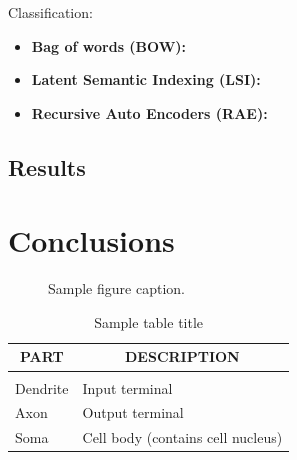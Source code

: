 \documentclass{article} %
\begin{document}
Classification:
\begin{itemize}
\item {\bf Bag of words (BOW):}
\item{\bf Latent Semantic Indexing (LSI):}
\item{\bf Recursive Auto Encoders (RAE):}
\end{itemize}

\subsection{Results}
\label{sec:results}



\section{Conclusions}
\label{sec:conclusions}


\begin{figure}[h]
\begin{center}
\fbox{\rule[-.5cm]{0cm}{4cm} \rule[-.5cm]{4cm}{0cm}}
\end{center}
\caption{Sample figure caption.}
\end{figure}



\begin{table}[t]
\caption{Sample table title}
\label{sample-table}
\begin{center}
\begin{tabular}{ll}
\multicolumn{1}{c}{\bf PART}  &\multicolumn{1}{c}{\bf DESCRIPTION}
\\ \hline \\
Dendrite         &Input terminal \\
Axon             &Output terminal \\
Soma             &Cell body (contains cell nucleus) \\
\end{tabular}
\end{center}
\end{table}




\end{document}
